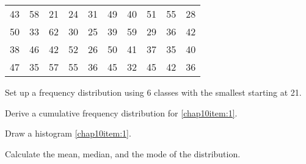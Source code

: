 \begin{myenumerate}
\begin{center}
\begin{tabular}{cccccccccc}
43 & 58 & 21 & 24 & 31 & 49 & 40 & 51 & 55 & 28\\
50 & 33 & 62 & 30 & 25 & 39 & 59 & 29 & 36 & 42\\
38 & 46 & 42 & 52 & 26 & 50 & 41 & 37 & 35 & 40\\
47 & 35 & 57 & 55 & 36 & 45 & 32 & 45 & 42 & 36\\
\end{tabular}
\end{center}
	\begin{myenumerate}
	\item\label{chap10item:1} Set up a frequency distribution using 6 classes with the smallest starting at 21.
	\item Derive a cumulative frequency distribution for \eqref{chap10item:1}.
	\item Draw a histogram \eqref{chap10item:1}.
	\item Calculate the mean, median, and the mode of the distribution.
	\end{myenumerate}
\end{myenumerate}
